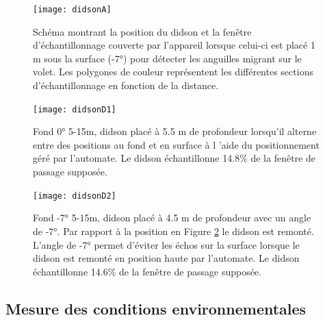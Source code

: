 \documentclass[11pt,twocolumn,titlepage,twoside]{article}
\begin{document}
\begin{figure}[htbp]
\centering
\texttt{[image: didsonA]}
\caption[schéma didson -7° 5-15m]{Schéma montrant la position du didson et
la fenêtre d'échantillonnage couverte par l'appareil lorsque celui-ci est placé
1 m sous la surface (-7°) pour détecter les anguilles migrant sur le volet.
Les polygones de couleur représentent les différentes sections
d'échantillonnage en fonction de la distance.}
\label{didsonsurface}
\end{figure}

\begin{figure}[htbp]
\centering
\texttt{[image: didsonD1]}
\caption[schéma didson 0° 5-15m]{Fond 0° 5-15m, didson placé à 5.5 m de
profondeur lorsqu'il alterne entre des positions au fond et en surface à l 'aide
du positionnement géré par l'automate. Le didson échantillonne 
\num[round-mode=places,round-precision=1]{14.8}\%
de la fenêtre de passage supposée. 
}
\label{didsonD1}
\end{figure}
\begin{figure}[htbp]
\centering
\texttt{[image: didsonD2]}
\caption[schéma didson -7° 5-15m]{Fond -7° 5-15m, didson placé à 4.5 m de
profondeur avec un angle de -7°. Par rapport à la position en
Figure \ref{didsonD1} le didson est remonté. L'angle de -7° permet d'éviter les
échos sur la surface lorsque le didson est remonté en position haute par l'automate. Le didson
échantillonne
\num[round-mode=places,round-precision=1]{14.6}\%
de la fenêtre de passage supposée.
}
\label{didsonD2}
\end{figure}

 
\subsection{Mesure des conditions environnementales}
\end{document}
